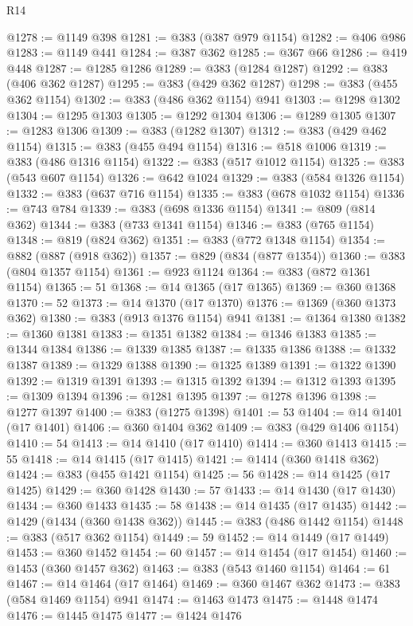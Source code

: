 \begin{lexlean}{R14}
\begin{coremodule}
@1278 := @1149 @398
@1281 := @383 (@387 @979 @1154)
@1282 := @406 @986
@1283 := @1149 @441
@1284 := @387 @362
@1285 := @367 @66
@1286 := @419 @448
@1287 := @1285 @1286
@1289 := @383 (@1284 @1287)
@1292 := @383 (@406 @362 @1287)
@1295 := @383 (@429 @362 @1287)
@1298 := @383 (@455 @362 @1154)
@1302 := @383 (@486 @362 @1154) @941
@1303 := @1298 @1302
@1304 := @1295 @1303
@1305 := @1292 @1304
@1306 := @1289 @1305
@1307 := @1283 @1306
@1309 := @383 (@1282 @1307)
@1312 := @383 (@429 @462 @1154)
@1315 := @383 (@455 @494 @1154)
@1316 := @518 @1006
@1319 := @383 (@486 @1316 @1154)
@1322 := @383 (@517 @1012 @1154)
@1325 := @383 (@543 @607 @1154)
@1326 := @642 @1024
@1329 := @383 (@584 @1326 @1154)
@1332 := @383 (@637 @716 @1154)
@1335 := @383 (@678 @1032 @1154)
@1336 := @743 @784
@1339 := @383 (@698 @1336 @1154)
@1341 := @809 (@814 @362)
@1344 := @383 (@733 @1341 @1154)
@1346 := @383 (@765 @1154)
@1348 := @819 (@824 @362)
@1351 := @383 (@772 @1348 @1154)
@1354 := @882 (@887 (@918 @362))
@1357 := @829 (@834 (@877 @1354))
@1360 := @383 (@804 @1357 @1154)
@1361 := @923 @1124
@1364 := @383 (@872 @1361 @1154)
@1365 := 51
@1368 := @14 @1365 (@17 @1365)
@1369 := @360 @1368
@1370 := 52
@1373 := @14 @1370 (@17 @1370)
@1376 := @1369 (@360 @1373 @362)
@1380 := @383 (@913 @1376 @1154) @941
@1381 := @1364 @1380
@1382 := @1360 @1381
@1383 := @1351 @1382
@1384 := @1346 @1383
@1385 := @1344 @1384
@1386 := @1339 @1385
@1387 := @1335 @1386
@1388 := @1332 @1387
@1389 := @1329 @1388
@1390 := @1325 @1389
@1391 := @1322 @1390
@1392 := @1319 @1391
@1393 := @1315 @1392
@1394 := @1312 @1393
@1395 := @1309 @1394
@1396 := @1281 @1395
@1397 := @1278 @1396
@1398 := @1277 @1397
@1400 := @383 (@1275 @1398)
@1401 := 53
@1404 := @14 @1401 (@17 @1401)
@1406 := @360 @1404 @362
@1409 := @383 (@429 @1406 @1154)
@1410 := 54
@1413 := @14 @1410 (@17 @1410)
@1414 := @360 @1413
@1415 := 55
@1418 := @14 @1415 (@17 @1415)
@1421 := @1414 (@360 @1418 @362)
@1424 := @383 (@455 @1421 @1154)
@1425 := 56
@1428 := @14 @1425 (@17 @1425)
@1429 := @360 @1428
@1430 := 57
@1433 := @14 @1430 (@17 @1430)
@1434 := @360 @1433
@1435 := 58
@1438 := @14 @1435 (@17 @1435)
@1442 := @1429 (@1434 (@360 @1438 @362))
@1445 := @383 (@486 @1442 @1154)
@1448 := @383 (@517 @362 @1154)
@1449 := 59
@1452 := @14 @1449 (@17 @1449)
@1453 := @360 @1452
@1454 := 60
@1457 := @14 @1454 (@17 @1454)
@1460 := @1453 (@360 @1457 @362)
@1463 := @383 (@543 @1460 @1154)
@1464 := 61
@1467 := @14 @1464 (@17 @1464)
@1469 := @360 @1467 @362
@1473 := @383 (@584 @1469 @1154) @941
@1474 := @1463 @1473
@1475 := @1448 @1474
@1476 := @1445 @1475
@1477 := @1424 @1476

\end{coremodule}
\end{lexlean}
